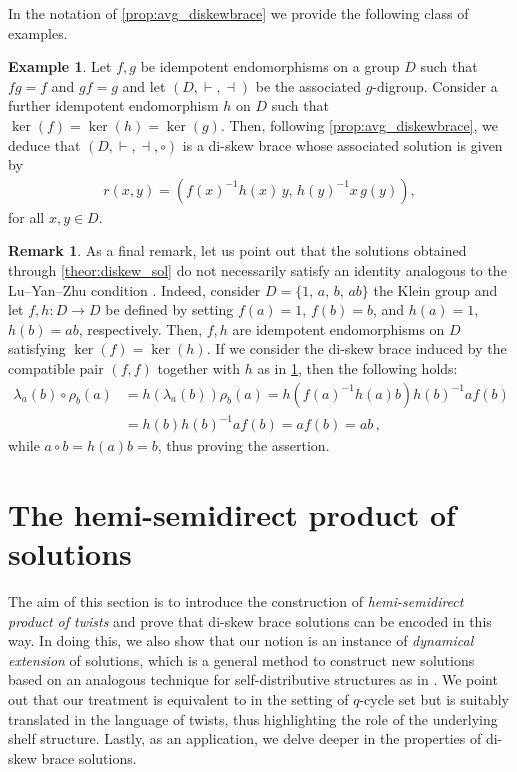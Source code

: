 \documentclass[preprint,1p]{elsarticle}
\numberwithin{equation}{section}
\theoremstyle{definition}               %
\newtheorem{ex}[theor]{Example}
\newtheorem{rem}[theor]{Remark}
\newcommand{\vd}{\vdash}
\newcommand{\dv}{\dashv}
\begin{document}
\smallskip

In the notation of \cref{prop:avg_diskewbrace} we provide the following class of examples.

\begin{ex}\label{ex:avg_diskewbrace}
    Let $f,g$ be idempotent endomorphisms on a group $D$ such that $fg = f$ and $gf = g$ and let $(D,\vd,\dv)$ be the associated $g$-digroup.
    Consider a further idempotent endomorphism $h$ on $D$ such that $\ker(f) = \ker(h) = \ker(g)$.
        Then, following \cref{prop:avg_diskewbrace}, we deduce that $(D,\vd,\dv,\circ)$ is a di-skew brace whose associated solution is given by
        \begin{align*}
            r(x,y) = \left(f(x)^{-1}h(x)\,y,\, h(y)^{-1} x\,g(y)\right),
        \end{align*}
        for all $x,y\in D$.
\end{ex}


\begin{rem}
    As a final remark, let us point out that the solutions obtained through \cref{theor:diskew_sol} do not necessarily satisfy an identity analogous to the Lu--Yan--Zhu condition \cite{LuYZ00}.
    Indeed, consider $D =\{1,\, a,\, b,\, ab\}$ the Klein group and let $f,h:D\to D$ be defined by setting $f(a) = 1$, $f(b) = b$, and $h(a) = 1$, $h(b) = ab$, respectively. 
    Then, $f,h$ are idempotent endomorphisms on $D$ satisfying $\ker(f) = \ker(h)$.
    {If we consider the di-skew brace induced by the compatible pair $(f,f)$ together with $h$ as in \cref{ex:avg_diskewbrace}, then the following holds:
    \begin{align*}
        \lambda_a(b) \circ \rho_b(a) &= h\left(\lambda_a(b)\right)\rho_b(a) 
        = h\left(f(a)^{-1}h(a) b\right) h(b)^{-1} a f(b) \\
        &= h(b) h(b)^{-1} a f(b)
        = a f(b) 
        = a b \,,
    \end{align*}
    while $a \circ b = h(a)b = b$, thus proving the assertion.}
\end{rem}

\smallskip

\section{The hemi-semidirect product of solutions}\label{Sec4}

The aim of this section is to introduce the construction of \emph{hemi-semidirect product of twists} and prove that di-skew brace solutions can be encoded in this way.
In doing this, we also show that our notion is an instance of \emph{dynamical extension} of solutions, which is a general method to construct new solutions based on an analogous technique for self-distributive structures as in \cite{AndGr03}.
We point out that our treatment is equivalent to  \cite{CasCatSte22} in the setting of $q$-cycle set but is suitably translated in the language of twists, thus highlighting the role of the underlying shelf structure.
Lastly, as an application, we delve deeper in the properties of di-skew brace solutions.
\end{document}
